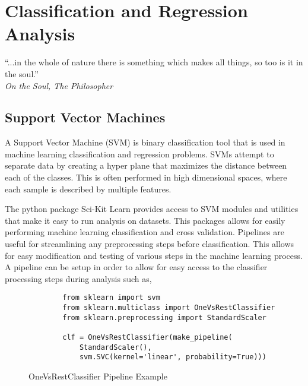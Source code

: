\chapter{Classification and Regression Analysis}
\begin{center}
  \begin{minipage}{0.75\textwidth}
    \begin{small}
      “...in the whole of nature there is something which makes all things, so too is it in the soul.”\\
      \null\hfill\emph{On the Soul, The Philosopher}
    \end{small}
  \end{minipage}
  \vspace{0.5cm}
\end{center}

\section{Support Vector Machines}
A Support Vector Machine (SVM) is binary classification tool that is used in machine learning classification and regression problems.  SVMs attempt to separate data by creating a hyper plane that maximizes the distance between each of the classes.  This is often performed in high dimensional spaces, where each sample is described by multiple features.

The python package Sci-Kit Learn provides access to SVM modules and utilities that make it easy to run analysis on datasets.  This packages allows for easily performing machine learning classification and cross validation.  Pipelines are useful for streamlining any preprocessing steps before classification.  This allows for easy modification and testing of various steps in the machine learning process.  A pipeline can be setup in order to allow for easy access to the classifier processing steps during analysis such as,
%
\begin{figure}
    \begin{lstlisting}
        from sklearn import svm
        from sklearn.multiclass import OneVsRestClassifier
        from sklearn.preprocessing import StandardScaler

        clf = OneVsRestClassifier(make_pipeline(
            StandardScaler(),
            svm.SVC(kernel='linear', probability=True)))
    \end{lstlisting}
    \caption{OneVsRestClassifier Pipeline Example}
    \label{fig:scattering}
\end{figure}

